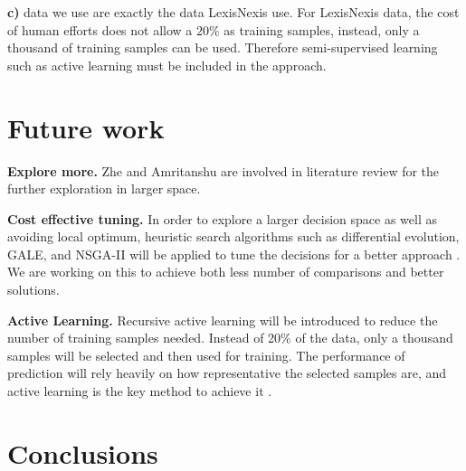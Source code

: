 \documentclass{sig-alternate-05-2015}
\begin{document}
\textbf{c)} data we use are exactly the data LexisNexis use. For LexisNexis data, the cost of human efforts does not allow a $20\%$ as  training samples, instead, only a thousand of training samples can be used. Therefore semi-supervised learning such as active learning must be included in the approach.


\section{Future work}


\textbf{Explore more.} Zhe and Amritanshu are involved in literature review for the further exploration in larger space.

\textbf{Cost effective tuning.} In order to explore a larger decision space as well as avoiding local optimum, heuristic search algorithms such as differential evolution, GALE, and NSGA-II will be applied to tune the decisions for a better approach \cite{storn1997differential,krall2015gale,deb2002fast}. We are working on this to achieve both less number of comparisons and better solutions.

\textbf{Active Learning.} Recursive active learning will be introduced to reduce the number of training samples needed. Instead of 20\% of the data, only a thousand samples will be selected and then used for training. The performance of prediction will rely heavily on how representative the selected samples are, and active learning is the key method to achieve it \cite{tong2002support}.





\section{Conclusions}
\label{sect:Conclusions}


 

%
 \renewcommand{\baselinestretch}{0.9}

\small

\balance
\renewcommand{\baselinestretch}{1}

%
%
\end{document}

